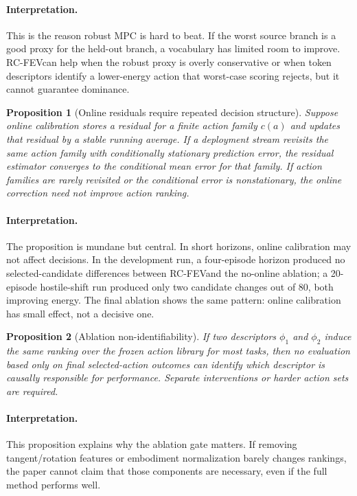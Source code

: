 \documentclass{article}
\newtheorem{proposition}{Proposition}
\newcommand{\method}{RC-FEV}
\newcommand{\features}{\phi}
\begin{document}
\paragraph{Interpretation.}
This is the reason robust MPC is hard to beat. If the worst source branch is a good proxy for the held-out branch, a vocabulary has limited room to improve. \method can help when the robust proxy is overly conservative or when token descriptors identify a lower-energy action that worst-case scoring rejects, but it cannot guarantee dominance.

\begin{proposition}[Online residuals require repeated decision structure]
Suppose online calibration stores a residual for a finite action family $c(a)$ and updates that residual by a stable running average. If a deployment stream revisits the same action family with conditionally stationary prediction error, the residual estimator converges to the conditional mean error for that family. If action families are rarely revisited or the conditional error is nonstationary, the online correction need not improve action ranking.
\end{proposition}

\paragraph{Interpretation.}
The proposition is mundane but central. In short horizons, online calibration may not affect decisions. In the development run, a four-episode horizon produced no selected-candidate differences between \method and the no-online ablation; a 20-episode hostile-shift run produced only two candidate changes out of 80, both improving energy. The final ablation shows the same pattern: online calibration has small effect, not a decisive one.

\begin{proposition}[Ablation non-identifiability]
If two descriptors $\features_1$ and $\features_2$ induce the same ranking over the frozen action library for most tasks, then no evaluation based only on final selected-action outcomes can identify which descriptor is causally responsible for performance. Separate interventions or harder action sets are required.
\end{proposition}

\paragraph{Interpretation.}
This proposition explains why the ablation gate matters. If removing tangent/rotation features or embodiment normalization barely changes rankings, the paper cannot claim that those components are necessary, even if the full method performs well.
\end{document}
